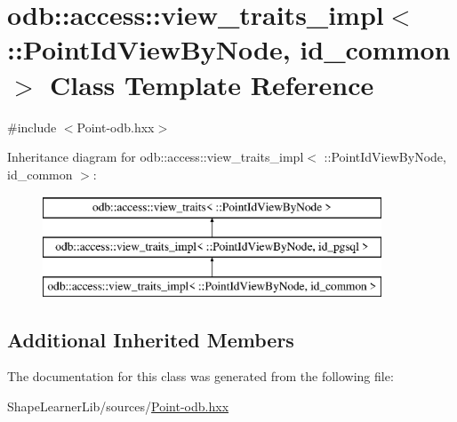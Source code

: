 \hypertarget{classodb_1_1access_1_1view__traits__impl_3_01_1_1_point_id_view_by_node_00_01id__common_01_4}{}\section{odb\+:\+:access\+:\+:view\+\_\+traits\+\_\+impl$<$ \+:\+:Point\+Id\+View\+By\+Node, id\+\_\+common $>$ Class Template Reference}
\label{classodb_1_1access_1_1view__traits__impl_3_01_1_1_point_id_view_by_node_00_01id__common_01_4}


{\ttfamily \#include $<$Point-\/odb.\+hxx$>$}

Inheritance diagram for odb\+:\+:access\+:\+:view\+\_\+traits\+\_\+impl$<$ \+:\+:Point\+Id\+View\+By\+Node, id\+\_\+common $>$\+:\begin{figure}[H]
\begin{center}
\leavevmode
\includegraphics[height=3.000000cm]{d6/dd6/classodb_1_1access_1_1view__traits__impl_3_01_1_1_point_id_view_by_node_00_01id__common_01_4}
\end{center}
\end{figure}
\subsection*{Additional Inherited Members}


The documentation for this class was generated from the following file\+:\begin{DoxyCompactItemize}
\item 
Shape\+Learner\+Lib/sources/\hyperlink{_point-odb_8hxx}{Point-\/odb.\+hxx}\end{DoxyCompactItemize}
